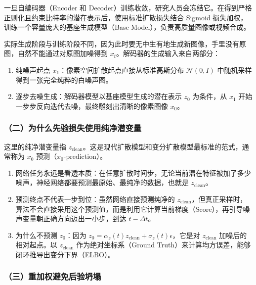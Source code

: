 一旦自编码器（Encoder 和 Decoder）训练收敛，研究人员会冻结它。在得到严格正则化且约束比特率的潜在表示后，使用标准扩散损失结合 Sigmoid 损失加权，训练一个容量庞大的基座生成模型（Base Model），负责高质量图像或视频合成。

实际生成阶段与训练阶段不同，因为此时要无中生有地生成新图像，手里没有原图，自然不能通过对原图加噪得到 \(x_t\)。解码器的生成输入来自两部分：

\begin{enumerate}
\def\labelenumi{\arabic{enumi}.}
\tightlist
\item
  纯噪声起点 \(x_1\)：像素空间扩散起点直接从标准高斯分布 \(\mathcal{N}(0,I)\) 中随机采样得到一张完全纯粹的白噪声图。
\item
  逐步去噪生成：解码器模型以基座模型生成的潜在表示 \(z_0\) 为条件，从 \(x_1\) 开始一步步反向迭代去噪，最终雕刻出清晰的像素图像 \(x_0\)。
\end{enumerate}

\hypertarget{ux4e8cux4e3aux4ec0ux4e48ux5148ux9a8cux635fux5931ux4f7fux7528ux7eafux51c0ux6f5cux53d8ux91cf}{%
\subsubsection{（二）为什么先验损失使用纯净潜变量}\label{ux4e8cux4e3aux4ec0ux4e48ux5148ux9a8cux635fux5931ux4f7fux7528ux7eafux51c0ux6f5cux53d8ux91cf}}

这里的纯净潜变量指 \(z_{\mathrm{clean}}\)。这是现代扩散模型和变分扩散模型最标准的范式，通常称为 \(x_0\) 预测（\(x_0\)-prediction）。

\begin{enumerate}
\def\labelenumi{\arabic{enumi}.}
\tightlist
\item
  网络任务永远是看透本质：在任意扩散时间步，无论当前潜在特征被加了多少噪声，神经网络都要预测最原始、最纯净的数据，也就是 \(z_{\mathrm{clean}}\)。
\item
  预测终点不代表一步到位：虽然网络直接预测纯净的 \(z_{\mathrm{clean}}\)，但真正采样时，算法不会直接采用这个预测值，而是利用它计算当前梯度（Score），再引导噪声变量朝正确方向迈出一小步，到达 \(t-\Delta t\)。
\item
  为什么不预测 \(z_0\)：因为 \(z_0=\alpha_z(t)z_{\mathrm{clean}}+\sigma_z(t)\epsilon\)，它是对 \(z_{\mathrm{clean}}\) 加噪后的相对起点。以 \(z_{\mathrm{clean}}\) 作为绝对坐标系（Ground Truth）来计算均方误差，能够闭环推导出变分下界（ELBO）。
\end{enumerate}

\hypertarget{ux4e09ux91cdux52a0ux6743ux907fux514dux540eux9a8cux574dux584c}{%
\subsubsection{（三）重加权避免后验坍塌}\label{ux4e09ux91cdux52a0ux6743ux907fux514dux540eux9a8cux574dux584c}}


